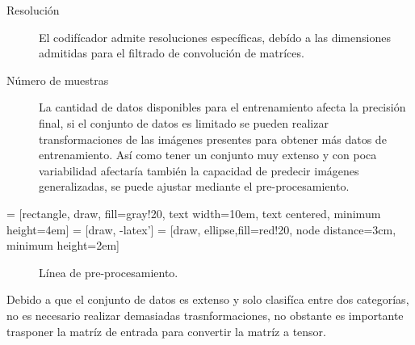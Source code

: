 \begin{description}
    \item[Resolución]{ El codifícador admite resoluciones específicas, debído a las dimensiones admitidas para el filtrado de convolución de matríces.}
    \item[Número de muestras]{La cantidad de datos disponibles para el entrenamiento afecta la precisión final, si el conjunto de datos es limitado se pueden realizar transformaciones de las imágenes presentes para obtener más datos de entrenamiento. Así como tener un conjunto muy extenso y con poca variabilidad afectaría también la capacidad de predecir imágenes generalizadas, se puede ajustar mediante el pre-procesamiento.}
    \item[] 
\end{description}


 = [rectangle, draw, fill=gray!20, 
    text width=10em, text centered, minimum height=4em]
 = [draw, -latex']
 = [draw, ellipse,fill=red!20, node distance=3cm,
    minimum height=2em]

\begin{figure}[H]
    \centering
    \begin{adjustbox}{width=0.9\linewidth}
    \end{adjustbox}
    \caption{Línea de pre-procesamiento.}
    \label{fig: pipeline}
\end{figure}


Debido a que el conjunto de datos es extenso y solo clasifíca entre dos categorías, no es necesario realizar demasiadas trasnformaciones, no obstante es importante trasponer la matríz de entrada para convertir la matríz a tensor.

